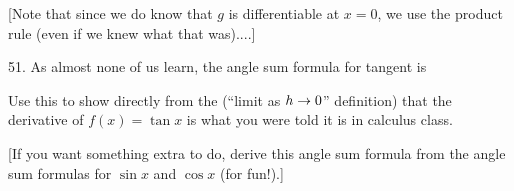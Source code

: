 \documentclass[12pt]{article}
\begin{document}
\begin{description}
\ssk

\item{\spc} [Note that since we do  know that $g$ is differentiable at
$x=0$, we  use the product rule (even if we knew what that was)....]

\msk

\item{51.} As almost none of us learn, the angle sum formula for tangent is

\ssk


\ssk

\item{\spc} Use this to show directly from the (``limit as $h\rightarrow 0$'' definition) that the 
derivative of $f(x)=\tan x$ is what you were told it is in calculus class.

\ssk

\item{\spc} [If you want something extra to do, derive this angle sum formula from the
angle sum formulas for $\sin x$ and $\cos x$ (for fun!).]


\end{description}
\vfill
\end{document}
